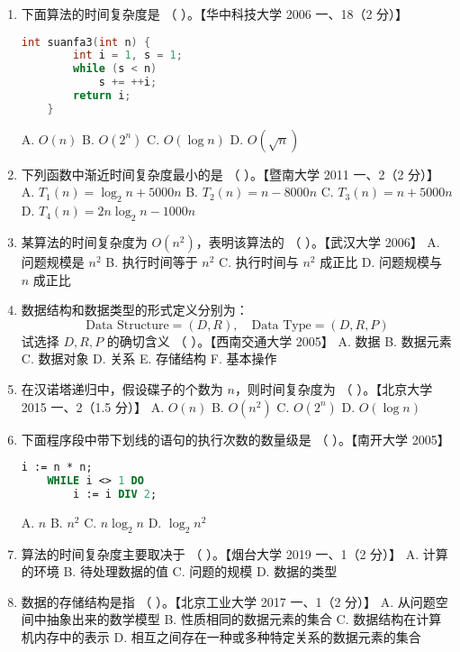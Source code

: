 \documentclass[lang=cn,newtx,10pt,scheme=chinese]{elegantbook}
\begin{document}
\begin{enumerate}
    \item 下面算法的时间复杂度是 （ \quad）。【华中科技大学 2006 一、18（2 分）】  
    \begin{lstlisting}[language=C]
    int suanfa3(int n) {
        int i = 1, s = 1;
        while (s < n)
            s += ++i;
        return i;
    }
    \end{lstlisting}
    A. $O(n)$ \quad B. $O(2^n)$ \quad C. $O(\log n)$ \quad D. $O(\sqrt{n})$

    \item 下列函数中渐近时间复杂度最小的是 （ \quad）。【暨南大学 2011 一、2（2 分）】  
    A. $T_1(n) = \log_2 n + 5000n$  
    B. $T_2(n) = n - 8000n$  
    C. $T_3(n) = n + 5000n$  
    D. $T_4(n) = 2n \log_2 n - 1000n$

    \item 某算法的时间复杂度为 $O(n^2)$，表明该算法的 （ \quad）。【武汉大学 2006】  
    A. 问题规模是 $n^2$  
    B. 执行时间等于 $n^2$  
    C. 执行时间与 $n^2$ 成正比  
    D. 问题规模与 $n$ 成正比  

    \item 数据结构和数据类型的形式定义分别为：  
    \[
    \text{Data Structure} = (D, R), \quad \text{Data Type} = (D, R, P)
    \]
    试选择 $D, R, P$ 的确切含义 （ \quad）。【西南交通大学 2005】  
    A. 数据 \quad B. 数据元素 \quad C. 数据对象  
    D. 关系 \quad E. 存储结构 \quad F. 基本操作  

    \item 在汉诺塔递归中，假设碟子的个数为 $n$，则时间复杂度为 （ \quad）。【北京大学 2015 一、2（1.5 分）】  
    A. $O(n)$ \quad B. $O(n^2)$ \quad C. $O(2^n)$ \quad D. $O(\log n)$  

    \item 下面程序段中带下划线的语句的执行次数的数量级是 （ \quad）。【南开大学 2005】  
    \begin{lstlisting}[language=Pascal]
    i := n * n;
    WHILE i <> 1 DO
        i := i DIV 2;
    \end{lstlisting}
    A. $n$ \quad B. $n^2$ \quad C. $n \log_2 n$ \quad D. $\log_2 n^2$

    \item 算法的时间复杂度主要取决于 （ \quad）。【烟台大学 2019 一、1（2 分）】  
    A. 计算的环境 \quad B. 待处理数据的值  
    C. 问题的规模 \quad D. 数据的类型  

    \item 数据的存储结构是指 （ \quad）。【北京工业大学 2017 一、1（2 分）】  
    A. 从问题空间中抽象出来的数学模型  
    B. 性质相同的数据元素的集合  
    C. 数据结构在计算机内存中的表示  
    D. 相互之间存在一种或多种特定关系的数据元素的集合  


\end{enumerate}
\end{document}
